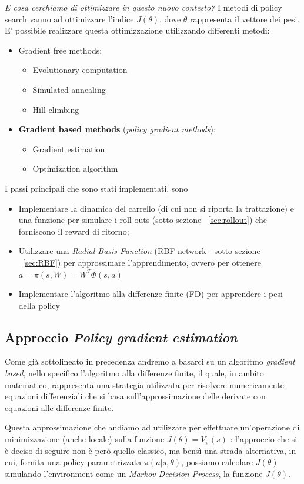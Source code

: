 \textit{E cosa cerchiamo di ottimizzare in questo nuovo contesto?}
I metodi di policy search vanno ad ottimizzare l'indice $J(\theta)$, dove $\theta$ rappresenta il vettore dei pesi.
E' possibile realizzare questa ottimizzazione utilizzando differenti metodi:
\begin{itemize}
	\item Gradient free methods:
	\begin{itemize}
		\item Evolutionary computation
		\item Simulated annealing
		\item Hill climbing
	\end{itemize}
	\item \textbf{Gradient based methods} (\textit{policy gradient methods}):
	\begin{itemize}
		\item  Gradient estimation 
		\item Optimization algorithm
	\end{itemize}
\end{itemize}

I passi principali che sono stati implementati, sono
\begin{itemize}
	\item Implementare la dinamica del carrello (di cui non si riporta la trattazione) e una funzione per simulare i roll-outs (sotto sezione ~\ref{sec:rollout}) che forniscono il reward di ritorno;
	\item Utilizzare una \textit{Radial Basis Function} (RBF network - sotto sezione ~\ref{sec:RBF}) per approssimare l'apprendimento, ovvero per ottenere $a = \pi(s,W) = W^T\Phi(s,a)$
	\item Implementare l'algoritmo alla differenze finite (FD) per apprendere i pesi della policy
\end{itemize}

\subsection{Approccio \textit{Policy gradient estimation}}
Come già sottolineato in precedenza andremo a basarci su un algoritmo \textit{gradient based}, nello specifico l'algoritmo alla differenze finite, il quale, in ambito matematico, rappresenta una strategia utilizzata per risolvere numericamente equazioni differenziali che si basa sull'approssimazione delle derivate con equazioni alle differenze finite.

Questa approssimazione che andiamo ad utilizzare per effettuare un'operazione di minimizzazione (anche locale) sulla funzione $J(\theta) = V_\pi(s)$ \label{eq:J_function_to_minimize}: l'approccio che si è deciso di seguire non è però quello classico, ma bensì una strada alternativa, in cui, fornita una policy parametrizzata $\pi(a|s,\theta)$, possiamo calcolare $J(\theta)$ simulando l'environment come un \textit{Markov Decision Process}, la funzione $J(\theta)$. 

